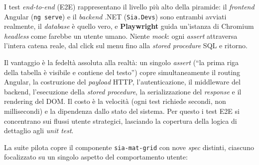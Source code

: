 I test \emph{end-to-end} (E2E) rappresentano il livello più alto della piramide: il
\emph{frontend} Angular (\texttt{ng serve}) e il \emph{backend} .NET (\texttt{Sia.Devs}) sono
entrambi avviati realmente, il \emph{database} è quello vero, e \textbf{Playwright}
guida un'istanza di Chromium \emph{headless} come farebbe un utente umano. Niente
\emph{mock}: ogni \emph{assert} attraversa l'intera catena reale, dal click sul
menu fino alla \emph{stored procedure} SQL e ritorno.

Il vantaggio è la fedeltà assoluta alla realtà: un singolo \emph{assert} (``la prima
riga della tabella è visibile e contiene del testo'') copre simultaneamente il
routing Angular, la costruzione del \emph{payload} HTTP, l'autenticazione, il
middleware del backend, l'esecuzione della \emph{stored procedure}, la
serializzazione del \emph{response} e il rendering del DOM. Il costo è la velocità
(ogni test richiede secondi, non millisecondi) e la dipendenza dallo stato del
sistema. Per questo i test E2E si concentrano sui flussi utente strategici,
lasciando la copertura della logica di dettaglio agli \emph{unit test}.

La suite pilota copre il componente \texttt{sia-mat-grid} con nove \emph{spec}
distinti, ciascuno focalizzato su un singolo aspetto del comportamento utente:

